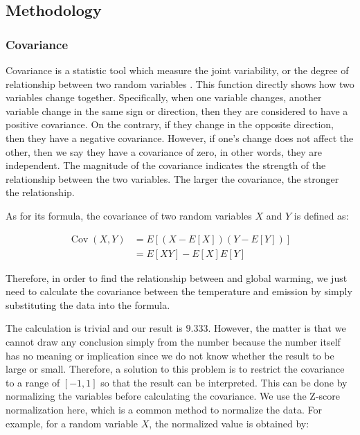 \documentclass[12pt,a4paper]{article}
\begin{document}
    \subsection{Methodology}
    \subsubsection{Covariance}
    Covariance is a statistic tool which measure the joint variability, or the degree of relationship between two random variables \autocite{rice_mathematical_2007}. This function directly shows how two variables change together. Specifically, when one variable changes, another variable change in the same sign or direction, then they are considered to have a positive covariance. On the contrary, if they change in the opposite direction, then they have a negative covariance. However, if one's change does not affect the other, then we say they have a covariance of zero, in other words, they are independent. The magnitude of the covariance indicates the strength of the relationship between the two variables. The larger the covariance, the stronger the relationship. 
    
    As for its formula, the covariance of two random variables $X$ and $Y$ is defined as:
    
    \begin{equation}
        \begin{aligned}
        \operatorname{Cov}(X, Y)&=E[(X-E[X])(Y-E[Y])] \\
        &=E[XY]-E[X]E[Y]
        \end{aligned}
    \end{equation}
    
    Therefore, in order to find the relationship between  and global warming, we just need to calculate the covariance between the temperature and  emission by simply substituting the data into the formula. 

    The calculation is trivial and our result is $9.333$. However, the matter is that we cannot draw any conclusion simply from the number because the number itself has no meaning or implication since we do not know whether the result to be large or small. Therefore, a solution to this problem is to restrict the covariance to a range of $[-1,1]$ so that the result can be interpreted. This can be done by normalizing the variables before calculating the covariance. We use the Z-score normalization here, which is a common method to normalize the data. For example, for a random variable $X$, the normalized value is obtained by:
    
\end{document}
